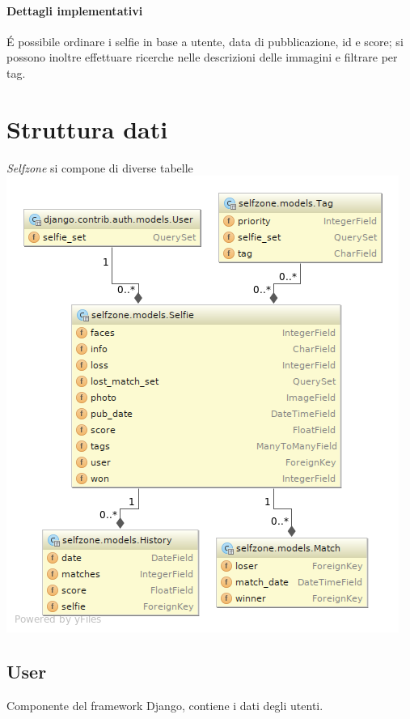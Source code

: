 \documentclass{article}
\newcommand{\proj}{\textit{Selfzone }}
\begin{document}
\paragraph{Dettagli implementativi}
\'E possibile ordinare i selfie in base a utente, data di pubblicazione, id e score; si possono inoltre effettuare ricerche nelle descrizioni delle immagini e filtrare per tag.


\section{Struttura dati}
\proj si compone di diverse tabelle\\
\includegraphics[width=\textwidth]{res/models_diagram.png}
\clearpage

\subsection{User}
Componente del framework Django, contiene i dati degli utenti.
\end{document}
